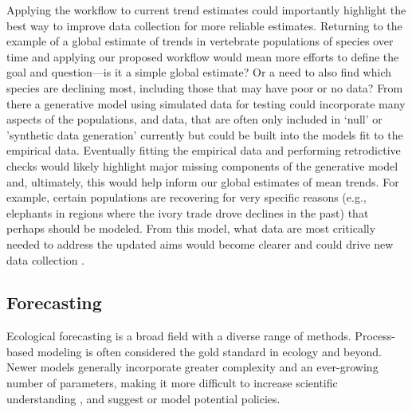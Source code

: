 \documentclass[11pt]{article}
\begin{document}
Applying the workflow to current trend estimates could importantly highlight the best way to improve data collection for more reliable estimates. Returning to the example of a global estimate of trends in vertebrate populations of species over time and applying our proposed workflow would mean more efforts to define the goal and question---is it a simple global estimate? %
Or a need to also find which species are declining most, including those that may have poor or no data? From there a generative model using simulated data for testing could incorporate many aspects of the populations, and data, that are often only included in `null' or 'synthetic data generation' currently \citep{Buschke2021,mcrae2025utility} but could be built into the models fit to the empirical data. Eventually fitting the empirical data and performing retrodictive checks would likely highlight major missing components of the generative model and, ultimately, this would help inform our global estimates of mean trends. For example, certain populations are recovering for very specific reasons (e.g., elephants in regions where the ivory trade drove declines in the past) that perhaps should be modeled. From this model, what data are most critically needed to address the updated aims would become clearer and could drive new data collection \citep{toszogyova2024mathematical}. 

\subsection{Forecasting}

Ecological forecasting is a broad field with a diverse range of methods. Process-based modeling is often considered the gold standard in ecology \citep{Urban2016, Pilowsky2022} and beyond. Newer models generally incorporate greater complexity and an ever-growing number of parameters, making it more difficult to increase scientific understanding \citep{Franklin2020}, and suggest or model potential policies. 
\end{document}
